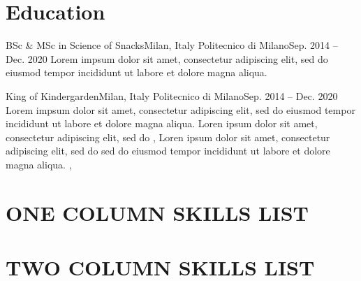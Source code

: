 \documentclass[letterpaper,11pt]{article}
\begin{document}
\section{Education}
\begin{sectionElementsList}
\experienceElement
{BSc \& MSc in Science of Snacks}{Milan, Italy}
{Politecnico di Milano}{Sep. 2014 -- Dec. 2020}
{
  Lorem impsum dolor sit amet, consectetur adipiscing elit, sed do eiusmod tempor incididunt ut labore et dolore magna aliqua.
}
{}

\experienceElement
{King of Kindergarden}{Milan, Italy}
{Politecnico di Milano}{Sep. 2014 -- Dec. 2020}
{
  Lorem impsum dolor sit amet, consectetur adipiscing elit, sed do eiusmod tempor incididunt ut labore et dolore magna aliqua.
}
{
  {
    Loren ipsum dolor sit amet, consectetur adipiscing elit, sed do
  },
  {
    Loren ipsum dolor sit amet, consectetur adipiscing elit, sed do
    sed do eiusmod tempor incididunt ut labore et dolore magna aliqua.
  },
}
\end{sectionElementsList}



\section{ONE COLUMN SKILLS LIST}
\begin{sectionElementsList}
\end{sectionElementsList}

\section{TWO COLUMN SKILLS LIST}
\begin{sectionElementsList}
\end{sectionElementsList}






\end{document}
